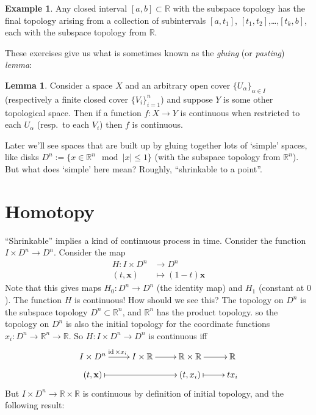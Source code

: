 \documentclass{tufte-handout}
\def\RR{\mathbb{R}}
\DeclareMathOperator{\id}{id}
\theoremstyle{definition}
\newtheorem{lemma}{Lemma}
\newtheorem{example}{Example}
\begin{document}
\begin{example}\label{example:interval_final_topology}
Any closed interval $[a,b]\subset \RR$ with the subspace topology has the final topology 
arising from a collection of subintervals $[a,t_1]$, $[t_1,t_2]$,\ldots,$[t_k,b]$, each
with the subspace topology from $\RR$.
\end{example}

These exercises give us what is sometimes known as the \emph{gluing} (or \emph{pasting}) \emph{lemma}:

\begin{lemma}\label{lemma:gluing_lemma}
Consider a space $X$ and an arbitrary open cover $\{U_\alpha\}_{\alpha\in I}$ 
(respectively a finite closed cover $\{V_i\}_{i=1}^n$) and suppose $Y$ is some other 
topological space. Then if a function $f\colon X\to Y$ is continuous when restricted to each 
$U_\alpha$ (resp.\ to each $V_i$) then $f$ is continuous.
\end{lemma}

Later we'll see spaces that are built up by gluing together lots 
of `simple' spaces, like disks $D^n := \{x\in \RR^n\mod |x|\leq 1\}$ (with the subspace 
topology from $\RR^n$). But what does `simple' here mean? Roughly, ``shrinkable to a 
point''.

\section{Homotopy}

``Shrinkable'' implies a kind of continuous process in time. Consider the function $I\times D^n \to D^n$. Consider the map
\begin{align*}
	H\colon I \times D^n & \to D^n\\
	(t,\mathbf{x}) & \mapsto (1-t)\mathbf{x}
\end{align*}
Note that this gives maps $H_0\colon D^n\to D^n$ (the identity map) and $H_1$ (constant at $0$).
The function $H$ is continuous! 
How should we see this? 
The topology on $D^n$ is the subspace topology $D^n \subset \RR^n$,\marginnote{And $I\subset \RR$ has subspace topology}  and $\RR^n$ has the product topology. 
so the topology on $D^n$ is also the initial topology for the coordinate functions 
$x_i\colon D^n \to \RR^n \to \RR$. 
So $H\colon I\times D^n \to D^n$ is continuous iff
\[
	\xymatrix@R=0.5pc{
	I\times D^n \ar[r]^{\id\times x_i} & I\times \RR \ar[r]& \RR\times\RR \ar[r]& \RR\\
	(t,\mathbf{x}) \ar@{|->}[rr] && (t,x_i) \ar@{|->}[r] & tx_i 
	}
\]
But $I\times D^n \to \RR \times \RR$ is continuous by definition of initial topology, and the following result:
\end{document}
